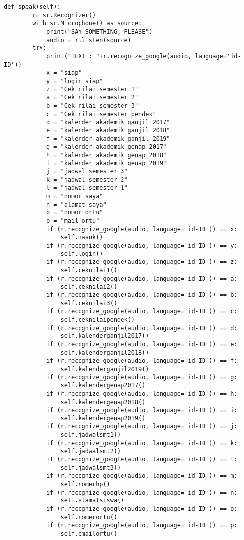 \begin{verbatim}
def speak(self):
        r= sr.Recognizer()
        with sr.Microphone() as source:
            print("SAY SOMETHING, PLEASE")
            audio = r.listen(source)
        try:
            print("TEXT : "+r.recognize_google(audio, language='id-ID'))
            x = "siap"
            y = "login siap"
            z = "Cek nilai semester 1"
            a = "Cek nilai semester 2"
            b = "Cek nilai semester 3"
            c = "Cek nilai semester pendek"
            d = "kalender akademik ganjil 2017"
            e = "kalender akademik ganjil 2018"
            f = "kalender akademik ganjil 2019"
            g = "kalender akademik genap 2017"
            h = "kalender akademik genap 2018"
            i = "kalender akademik genap 2019"
            j = "jadwal semester 3"
            k = "jadwal semester 2"
            l = "jadwal semester 1"
            m = "nomor saya"
            n = "alamat saya"
            o = "nomor ortu"
            p = "mail ortu"
            if (r.recognize_google(audio, language='id-ID')) == x:
                self.masuk()
            if (r.recognize_google(audio, language='id-ID')) == y:
                self.login()
            if (r.recognize_google(audio, language='id-ID')) == z:
                self.ceknilai1()
            if (r.recognize_google(audio, language='id-ID')) == a:
                self.ceknilai2()
            if (r.recognize_google(audio, language='id-ID')) == b:
                self.ceknilai3()
            if (r.recognize_google(audio, language='id-ID')) == c:
                self.ceknilaipendek()
            if (r.recognize_google(audio, language='id-ID')) == d:
                self.kalenderganjil2017()
            if (r.recognize_google(audio, language='id-ID')) == e:
                self.kalenderganjil2018()
            if (r.recognize_google(audio, language='id-ID')) == f:
                self.kalenderganjil2019()
            if (r.recognize_google(audio, language='id-ID')) == g:
                self.kalendergenap2017()
            if (r.recognize_google(audio, language='id-ID')) == h:
                self.kalendergenap2018()
            if (r.recognize_google(audio, language='id-ID')) == i:
                self.kalendergenap2019()
            if (r.recognize_google(audio, language='id-ID')) == j:
                self.jadwalsmt1()
            if (r.recognize_google(audio, language='id-ID')) == k:
                self.jadwalsmt2()
            if (r.recognize_google(audio, language='id-ID')) == l:
                self.jadwalsmt3()
            if (r.recognize_google(audio, language='id-ID')) == m:
                self.nomerhp()
            if (r.recognize_google(audio, language='id-ID')) == n:
                self.alamatsiswa()
            if (r.recognize_google(audio, language='id-ID')) == o:
                self.nomerortu()
            if (r.recognize_google(audio, language='id-ID')) == p:
                self.emailortu()
\end{verbatim}

